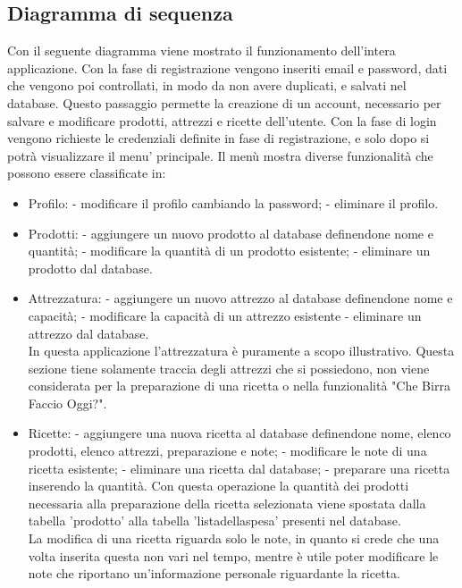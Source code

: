 \documentclass[a4paper, titlepage]{article}
\begin{document}
\subsection{Diagramma di sequenza}
Con il seguente diagramma viene mostrato il funzionamento dell’intera applicazione. Con la fase di registrazione vengono inseriti email e password, dati che vengono poi controllati, in modo da non avere duplicati, e salvati nel database. Questo passaggio permette la creazione di un account, necessario per salvare e modificare prodotti, attrezzi e ricette dell’utente. Con la fase di login vengono richieste le credenziali definite in fase di registrazione, e solo dopo si potrà visualizzare il menu’ principale. Il menù mostra diverse funzionalità che possono essere classificate in:
\begin{itemize}
    \item Profilo:
        \subitem - modificare il profilo cambiando la password;
        \subitem - eliminare il profilo.
    \item Prodotti:
        \subitem - aggiungere un nuovo prodotto al database definendone nome e quantità;
        \subitem - modificare la quantità di un prodotto esistente;
        \subitem - eliminare un prodotto dal database.
    \item Attrezzatura:
        \subitem - aggiungere un nuovo attrezzo al database definendone nome e capacità;
        \subitem - modificare la capacità di un attrezzo esistente
        \subitem - eliminare un attrezzo dal database.\\
        In questa applicazione l'attrezzatura è puramente a scopo illustrativo. Questa sezione tiene solamente traccia degli attrezzi che si possiedono, non viene considerata per la preparazione di una ricetta o nella funzionalità "Che Birra Faccio Oggi?".
    \item Ricette:
        \subitem - aggiungere una nuova ricetta al database definendone nome, elenco prodotti, elenco attrezzi, preparazione e note;
        \subitem - modificare le note di una ricetta esistente;
        \subitem - eliminare una ricetta dal database;
        \subitem - preparare una ricetta inserendo la quantità. Con questa operazione la quantità dei prodotti necessaria alla preparazione della ricetta selezionata viene spostata dalla tabella 'prodotto' alla tabella 'listadellaspesa' presenti nel database.\\
        La modifica di una ricetta riguarda solo le note, in quanto si crede che una volta inserita questa non vari nel tempo, mentre è utile poter modificare le note che riportano un'informazione personale riguardante la ricetta.

\end{itemize}
\end{document}
